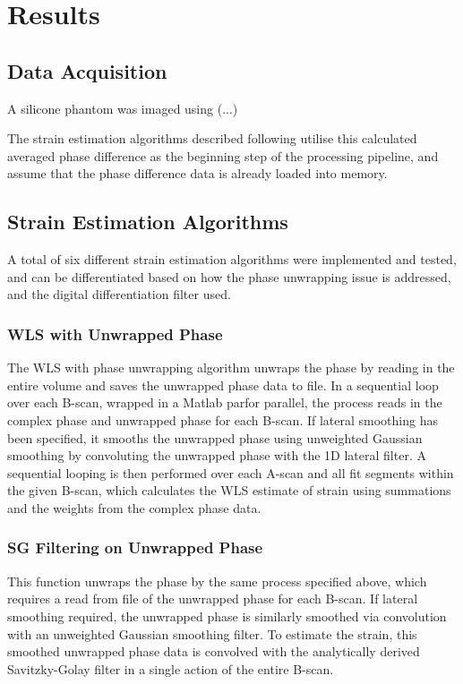 \chapter{Results}


\section{Data Acquisition}
A silicone phantom was imaged using (...)

The strain estimation algorithms described following utilise this calculated averaged phase difference as the beginning step of the processing pipeline, and assume that the phase difference data is already loaded into memory.

\section{Strain Estimation Algorithms}
A total of six different strain estimation algorithms were implemented and tested, and can be differentiated based on how the phase unwrapping issue is addressed, and the digital differentiation filter used. 

\subsection{WLS with Unwrapped Phase}
The WLS with phase unwrapping algorithm unwraps the phase by reading in the entire volume and saves the unwrapped phase data to file. In a sequential loop over each B-scan, wrapped in a Matlab parfor parallel, the process reads in the complex phase and unwrapped phase for each B-scan. If lateral smoothing has been specified, it smooths the unwrapped phase using unweighted Gaussian smoothing by convoluting the unwrapped phase with the 1D lateral filter. A sequential looping is then performed over each A-scan and all fit segments within the given B-scan, which calculates the WLS estimate of strain using summations and the weights from the complex phase data.

\subsection{SG Filtering on Unwrapped Phase}
This function unwraps the phase by the same process specified above, which requires a read from file of the unwrapped phase for each B-scan. If lateral smoothing required, the unwrapped phase is similarly smoothed via convolution with an unweighted Gaussian smoothing filter. To estimate the strain, this smoothed unwrapped phase data is convolved with the analytically derived Savitzky-Golay filter in a single action of the entire B-scan.

